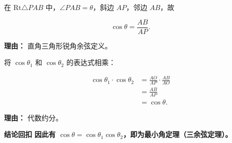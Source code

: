 \begin{proofbox}
\begin{description}[style=nextline, leftmargin=2.8em, labelsep=0.5em, itemsep=0.55em]
			在 $\mathrm{Rt}\triangle PAB$ 中，$\angle PAB = \theta$，斜边 $AP$，邻边 $AB$，故 \par
			\[
				\cos\theta = \frac{AB}{AP}.
			\]
			\par\textbf{理由：} 直角三角形锐角余弦定义。
		\item[\textbf{步骤七（代入化简得证）：}]
			将 $\cos\theta_1$ 和 $\cos\theta_2$ 的表达式相乘： \par
			\[
				\begin{aligned}
					\cos\theta_1\cdot\cos\theta_2 &= \frac{AO}{AP}\cdot\frac{AB}{AO} \\ &= \frac{AB}{AP} \\ &= \cos\theta .
			\end{aligned}
			\]
			\par\textbf{理由：} 代数约分。
	\end{description}

	\medskip
	\textbf{\textcolor{CProof}{结论回扣}}
	\textbf{因此有 $\cos\theta = \cos\theta_1\cos\theta_2$，即为最小角定理（三余弦定理）。}
\end{proofbox}
